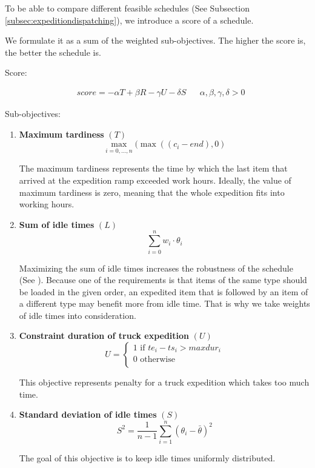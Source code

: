 \documentclass{ctuthesis}
\begin{document}
To be able to compare different feasible schedules (See Subsection \ref{subsec:expeditiondispatching}), we introduce a score of a schedule. 

We formulate it as a sum of the weighted sub-objectives. The higher the score is, the better the schedule is.

Score:

\begin{equation}
\begin{aligned}
    &score = -\alpha T + \beta R - \gamma  U - \delta S && \alpha, \beta, \gamma, \delta > 0
\end{aligned}
\end{equation}

Sub-objectives:

\begin{enumerate}
\item \textbf{Maximum tardiness} $(T)$\\ \begin{equation}\max_{i=0,\ldots,n}(\max((c_i - end), 0)\end{equation}

The maximum tardiness represents the time by which the last item that arrived at the expedition ramp exceeded work hours. Ideally, the value of maximum tardiness is zero, meaning that the whole expedition fits into working hours.

\item \textbf{Sum of idle times} $(L)$\\ 
\begin{equation}
    \sum_{i=0}^{n} w_i \cdot \theta_i
\end{equation}

Maximizing the sum of idle times increases the robustness of the schedule (See \cite{pinedo}). Because one of the requirements is that items of the same type should be loaded in the given order, an expedited item that is followed by an item of a different type may benefit more from idle time. That is why we take weights of idle times into consideration.

\item \textbf{Constraint duration of truck expedition} $(U)$
\begin{equation} 
   U = \begin{cases}
        1 \text{ if } te_i - ts_i > maxdur_i\\
        \text{0 otherwise}\\
       \end{cases}
\end{equation}

This objective represents penalty for a truck expedition which takes too much time.

\item \textbf{Standard deviation of idle times} $(S)$
\begin{equation} 
    S^2=\frac{1}{n-1}\sum_{i=1}^{n} (\theta_{i} -\bar{\theta})^2 
\end{equation}

The goal of this objective is to keep idle times uniformly distributed. 

\end{enumerate}
 
\end{document}
